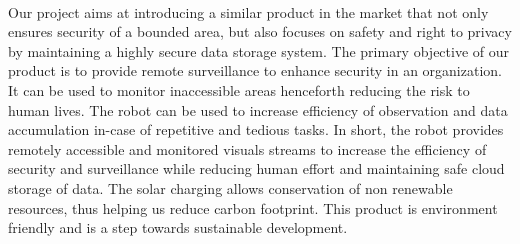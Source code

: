 \paragraph{}Our project aims at introducing a similar product in the market that not only ensures security of a bounded area, but also focuses on safety and right to privacy by
maintaining a highly secure data storage system.
The primary objective of our product is to provide remote surveillance to enhance security in an organization. It can be used to monitor inaccessible areas henceforth reducing the risk to human lives.
The robot can be used to increase efficiency of observation and data accumulation in-case of repetitive and tedious tasks. In short, the robot provides remotely
accessible and monitored visuals streams to increase the efficiency of
security and surveillance while reducing human effort and maintaining safe cloud
storage of data.
The solar charging allows conservation of non renewable resources, thus helping us reduce carbon footprint. This product is environment friendly and is a step towards sustainable development.
